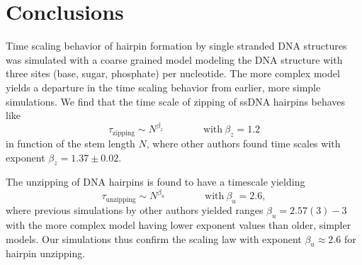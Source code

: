 \section{Conclusions}

Time scaling behavior of hairpin formation by single stranded DNA structures was simulated with a coarse grained model modeling the DNA structure with three sites (base, sugar, phosphate) per nucleotide. The more complex model yields a departure in the time scaling behavior from earlier, more simple simulations. We find that the time scale of zipping of ssDNA hairpins behaves like
\begin{equation}
\tau_\text{zipping} \sim N^{\beta_z} \qquad \qquad \text{with}\ \beta_z = 1.2
\end{equation}
in function of the stem length $N$, where other authors found time scales with exponent  $\beta_z = 1.37 \pm 0.02$.

The unzipping of DNA hairpins is found to have a timescale yielding
\begin{equation}
\tau_\text{unzipping} \sim N^{\beta_u} \qquad \qquad \text{with}\ \beta_u = 2.6,
\end{equation}
where previous simulations by other authors yielded ranges $\beta_u = 2.57(3) - 3$ with the more complex model having lower exponent values than older, simpler models. Our simulations thus confirm the scaling law with exponent $\beta_u \approx 2.6$ for hairpin unzipping.